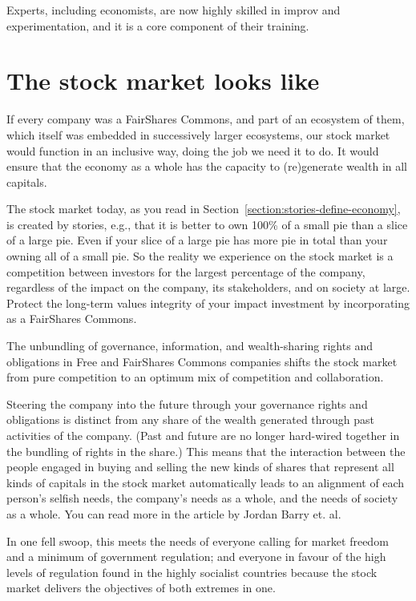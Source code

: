 Experts, including economists, are now highly skilled in improv and experimentation, and it is a core component of their training. 


\section{The stock market looks like}
If every company was a FairShares Commons, and part of an ecosystem of them, which itself was embedded in successively larger ecosystems, our stock market would function in an inclusive way, doing the job we need it to do. It would ensure that the economy as a whole has the capacity to (re)generate wealth in all capitals. 


The stock market today, as you read in Section~\ref{section:stories-define-economy}, is created by stories, e.g., that it is better to own 100\% of a small pie than a slice of a large pie. Even if your slice of a large pie has more pie in total than your owning all of a small pie. So the reality we experience on the stock market is a competition between investors for the largest percentage of the company, regardless of the impact on the company, its stakeholders, and on society at large. Protect the long-term values integrity of your impact investment by incorporating as a FairShares Commons.


The unbundling of governance, information, and wealth-sharing rights and obligations in Free and FairShares Commons companies shifts the stock market from pure competition to an optimum mix of competition and collaboration.


Steering the company into the future through your governance rights and obligations is distinct from any share of the wealth generated through past activities of the company. (Past and future are no longer hard-wired together in the bundling of rights in the share.) This means that the interaction between the people engaged in buying and selling the new kinds of shares that represent all kinds of capitals in the stock market automatically leads to an alignment of each person's selfish needs, the company’s needs as a whole, and the needs of society as a whole. You can read more in the article by Jordan Barry et. al\cite{barry-game-theory}.


In one fell swoop, this meets the needs of everyone calling for market freedom and a minimum of government regulation; and everyone in favour of the high levels of regulation found in the highly socialist countries because the stock market delivers the objectives of both extremes in one.


